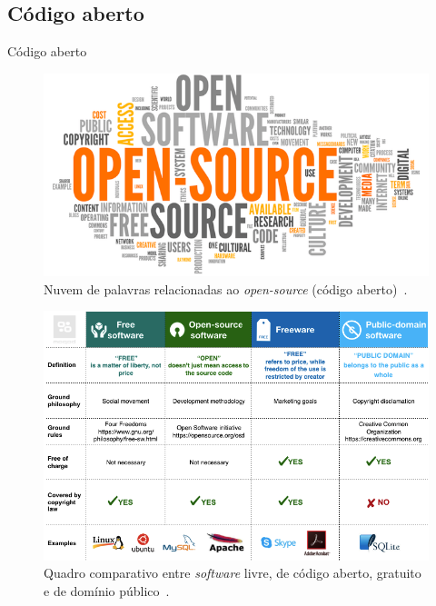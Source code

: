 \subsection{Código aberto}
\label{ss.open_source}

\begin{frame}{Código aberto}
	\begin{figure}
		\centering
		\includegraphics[scale=0.425]{figs/open_source_word_cloud.png}
		\caption{Nuvem de palavras relacionadas ao \emph{open-source} (código aberto)~\cite{Silva:21}.}
		\label{f.open_source_word_cloud}
	\end{figure}
\end{frame}

\begin{frame}{}
	\begin{figure}
		\centering
		\includegraphics[scale=0.35]{figs/open_source_difference.png}
		\caption{Quadro comparativo entre \emph{software} livre, de código aberto, gratuito e de domínio público~\cite{Todavchich:21}.}
		\label{f.open_source_difference}
	\end{figure}
\end{frame}


